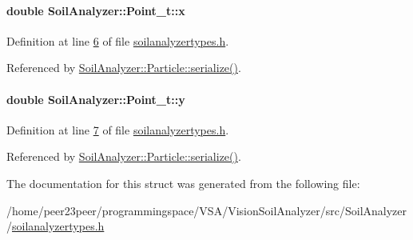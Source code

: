 \paragraph[{x}]{\setlength{\rightskip}{0pt plus 5cm}double Soil\+Analyzer\+::\+Point\+\_\+t\+::x}\label{struct_soil_analyzer_1_1_point__t_a926d8ebf458fddf1cc40e3df08a59e74}


Definition at line \hyperlink{soilanalyzertypes_8h_source_l00006}{6} of file \hyperlink{soilanalyzertypes_8h_source}{soilanalyzertypes.\+h}.



Referenced by \hyperlink{particle_8h_source_l00083}{Soil\+Analyzer\+::\+Particle\+::serialize()}.

\hypertarget{struct_soil_analyzer_1_1_point__t_ac3b3bcd50383851a31e9691fd9f0a8c0}{}
\paragraph[{y}]{\setlength{\rightskip}{0pt plus 5cm}double Soil\+Analyzer\+::\+Point\+\_\+t\+::y}\label{struct_soil_analyzer_1_1_point__t_ac3b3bcd50383851a31e9691fd9f0a8c0}


Definition at line \hyperlink{soilanalyzertypes_8h_source_l00007}{7} of file \hyperlink{soilanalyzertypes_8h_source}{soilanalyzertypes.\+h}.



Referenced by \hyperlink{particle_8h_source_l00083}{Soil\+Analyzer\+::\+Particle\+::serialize()}.



The documentation for this struct was generated from the following file\+:\begin{DoxyCompactItemize}
\item 
/home/peer23peer/programmingspace/\+V\+S\+A/\+Vision\+Soil\+Analyzer/src/\+Soil\+Analyzer/\hyperlink{soilanalyzertypes_8h}{soilanalyzertypes.\+h}\end{DoxyCompactItemize}
